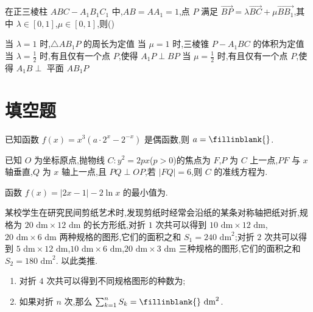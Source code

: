 \begin{problem}
在正三棱柱 \(ABC-A_1B_1C_1\) 中,\(AB=AA_1=1\),点 \(P\) 满足 \(\overrightarrow{BP}=\lambda\overrightarrow{BC}+\mu\overrightarrow{BB_1}\),其中 \(\lambda\in[0,1]\),\(\mu\in[0,1]\),则(\quad)

\choices
    {当 \(\lambda=1\) 时,\(\triangle AB_1P\) 的周长为定值}
    {当 \(\mu=1\) 时,三棱锥 \(P-A_1BC\) 的体积为定值}
    {当 \(\lambda=\frac{1}{2}\) 时,有且仅有一个点 \(P\),使得 \(A_1P\perp BP\)}
    {当 \(\mu=\frac{1}{2}\) 时,有且仅有一个点 \(P\),使得 \(A_1B\perp\) 平面 \(AB_1P\)}
\end{problem}

\section{填空题}

\begin{problem}
已知函数 \(f(x)=x^3\left( a\cdot 2^x-2^{-x} \right)\) 是偶函数,则 \(a=\fillinblank{}\).
\end{problem}

\begin{problem}
已知 \(O\) 为坐标原点,抛物线 \(C:y^2=2px\)(\(p>0\))的焦点为 \(F\),\(P\) 为 \(C\) 上一点,\(PF\) 与 \(x\) 轴垂直,\(Q\) 为 \(x\) 轴上一点,且 \(PQ\perp OP\),若 \(|FQ|=6\),则 \(C\) 的准线方程为\fillinblank{}.
\end{problem}

\begin{problem}
函数 \(f(x)=|2x-1|-2\ln x\) 的最小值为\fillinblank{}.
\end{problem}

\begin{problem}
某校学生在研究民间剪纸艺术时,发现剪纸时经常会沿纸的某条对称轴把纸对折,规格为 \(20\text{ dm}\times 12\text{ dm}\) 的长方形纸,对折 \(1\) 次共可以得到 \(10\text{ dm}\times 12\text{ dm}\),\(20\text{ dm}\times 6\text{ dm}\) 两种规格的图形,它们的面积之和 \(S_1=240\text{ dm}^2\);对折 \(2\) 次共可以得到 \(5\text{ dm}\times 12\text{ dm}\),\(10\text{ dm}\times 6\text{ dm}\),\(20\text{ dm}\times 3\text{ dm}\) 三种规格的图形,它们的面积之和 \(S_2=180\text{ dm}^2\). 以此类推.

\begin{enumerate}
\item 对折 \(4\) 次共可以得到不同规格图形的种数为\fillinblank{};
\item 如果对折 \(n\) 次,那么 \(\sum_{k=1}^n S_k=\fillinblank{}\text{ dm}^2\).
\end{enumerate}
\end{problem}

